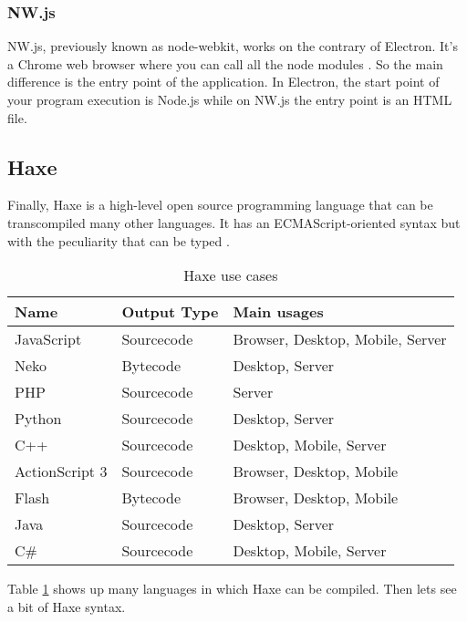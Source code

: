 \subsubsection{NW.js}

NW.js, previously known as node-webkit, works on the contrary of Electron. It's
a Chrome web browser where you can call all the node modules \cite{nwjs-web}.
So the main difference is the entry point of the application. In Electron, the
start point of your program execution is Node.js while on NW.js the entry point
is an HTML file.

\subsection{Haxe}

Finally, Haxe is a high-level open source programming language that can be 
transcompiled many other languages. It has an ECMAScript-oriented syntax but 
with the peculiarity that can be typed \cite{what-is-haxe}. 

\begin{table}[htb]
\begin{center}
\begin{tabular}{|l|l|l|}
\hline
{\bf Name }		& {\bf Output Type} & {\bf Main usages}  \\ \hline \hline
JavaScript		& Sourcecode		& Browser, Desktop, Mobile, Server \\ \hline
Neko			& Bytecode			& Desktop, Server   \\ \hline
PHP				& Sourcecode		& Server   \\ \hline
Python			& Sourcecode		& Desktop, Server   \\ \hline
C++				& Sourcecode		& Desktop, Mobile, Server   \\ \hline
ActionScript 3	& Sourcecode		& Browser, Desktop, Mobile   \\ \hline
Flash			& Bytecode			& Browser, Desktop, Mobile   \\ \hline
Java			& Sourcecode		& Desktop, Server   \\ \hline
C\#				& Sourcecode		& Desktop, Mobile, Server   \\ \hline
\end{tabular}
\caption{Haxe use cases \cite{what-is-haxe}}
\label{T:haxe-use-cases}
\end{center}
\end{table}

Table \ref{T:haxe-use-cases} shows up many languages in which Haxe can be
compiled. Then lets see a bit of Haxe syntax.

